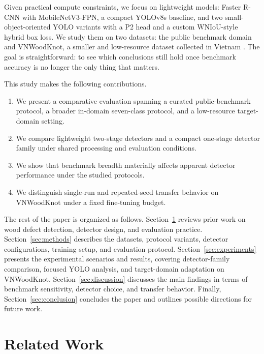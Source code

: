 \documentclass[10pt,a4paper]{article}
\begin{document}
Given practical compute constraints, we focus on lightweight models: Faster R-CNN with MobileNetV3-FPN, a compact YOLOv8s baseline, and two small-object-oriented YOLO variants with a P2 head and a custom WNIoU-style hybrid box loss. We study them on two datasets: the public benchmark domain \citep{kodytek_dataset} and VNWoodKnot, a smaller and low-resource dataset collected in Vietnam \citep{TRAN2025112039}. The goal is straightforward: to see which conclusions still hold once benchmark accuracy is no longer the only thing that matters.

This study makes the following contributions.

\begin{enumerate}[leftmargin=1.5em]
  \item We present a comparative evaluation spanning a curated public-benchmark protocol, a broader in-domain seven-class protocol, and a low-resource target-domain setting.
  \item We compare lightweight two-stage detectors and a compact one-stage detector family under shared processing and evaluation conditions.
  \item We show that benchmark breadth materially affects apparent detector performance under the studied protocols.
    \item We distinguish single-run and repeated-seed transfer behavior on VNWoodKnot under a fixed fine-tuning budget.
\end{enumerate}

The rest of the paper is organized as follows. Section~\ref{sec:related-work} reviews prior work on wood defect detection, detector design, and evaluation practice. Section~\ref{sec:methods} describes the datasets, protocol variants, detector configurations, training setup, and evaluation protocol. Section~\ref{sec:experiments} presents the experimental scenarios and results, covering detector-family comparison, focused YOLO analysis, and target-domain adaptation on VNWoodKnot. Section~\ref{sec:discussion} discusses the main findings in terms of benchmark sensitivity, detector choice, and transfer behavior. Finally, Section~\ref{sec:conclusion} concludes the paper and outlines possible directions for future work.

\section{Related Work}
\label{sec:related-work}

\end{document}

